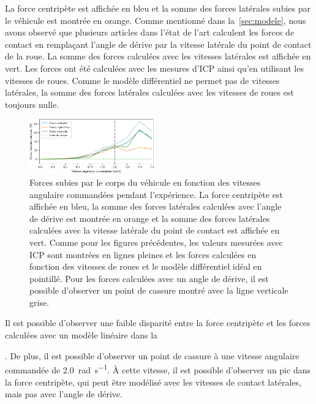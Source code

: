 La force centripète est affichée en bleu et la somme des forces latérales subies par le véhicule est montrée en orange.
Comme mentionné dans la~\autoref{sec:modele}, nous avons observé que plusieurs articles dans l'état de l'art calculent les forces de contact en remplaçant l'angle de dérive par la vitesse latérale du point de contact de la roue.
La somme des forces calculées avec les vitesses latérales est affichée en vert.
Les forces ont été calculées avec les mesures d'\ac{ICP} ainsi qu'en utilisant les vitesses de roues.
Comme le modèle différentiel ne permet pas de vitesses latérales, la somme des forces latérales calculées avec les vitesses de roues est toujours nulle.

\begin{figure}[htpb]
	\centering
	\includegraphics[width=0.48\textwidth]{figs/lateral_forces.pdf}
	\caption{Forces subies par le corps du véhicule en fonction des vitesses angulaire commandées pendant l'expérience.
			La force centripète est affichée en bleu, la somme des forces latérales calculées avec l'angle de dérive est montrée en orange et la somme des forces latérales calculées avec la vitesse latérale du point de contact est affichée en vert.
			Comme pour les figures précédentes, les valeurs mesurées avec \ac{ICP} sont montrées en lignes pleines et les forces calculées en fonction des vitesses de roues et le modèle différentiel idéal en pointillé.
			Pour les forces calculées avec un angle de dérive, il est possible d'observer un point de cassure montré avec la ligne verticale grise.}
	\label{fig:acceleration}
\end{figure}

Il est possible d'observer une faible disparité entre la force centripète et les forces calculées avec un modèle linéaire dans la~\author{fig:acceleration}.
De plus, il est possible d'observer un point de cassure à une vitesse angulaire commandée de \SI{2.0}{\radian\per\second}.
À cette vitesse, il est possible d'observer un pic dans la force centripète, qui peut être modélisé avec les vitesses de contact latérales, mais pas avec l'angle de dérive.
